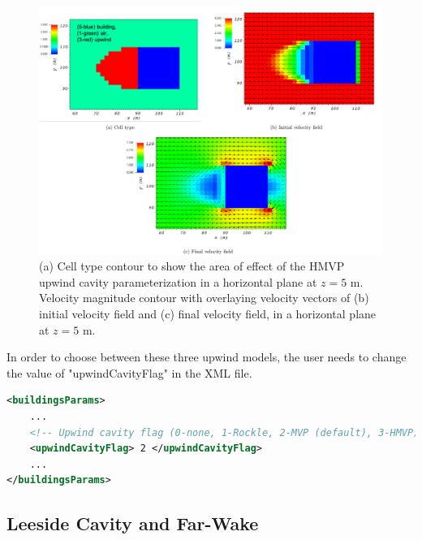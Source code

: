\begin{figure}[H]
    \centering
    \includegraphics[width=\textwidth]{Images/upwind_z_5_3.pdf}
    \caption{(a) Cell type contour to show the area of effect of the HMVP upwind cavity parameterization in a horizontal plane at $z=5$ m. Velocity magnitude contour with overlaying velocity vectors of (b) initial velocity field and (c) final velocity field, in a horizontal plane at $z=5$ m.}
\end{figure}

In order to choose between these three upwind models, the user needs to change the value of "upwindCavityFlag" in the XML file.


\begin{lstlisting}[language=XML]
<buildingsParams>
	...
	<!-- Upwind cavity flag (0-none, 1-Rockle, 2-MVP (default), 3-HMVP) -->
	<upwindCavityFlag> 2 </upwindCavityFlag>
	...
</buildingsParams>
\end{lstlisting}

\subsection{Leeside Cavity and Far-Wake}\label{leeside-cavity-and-far-wake}

